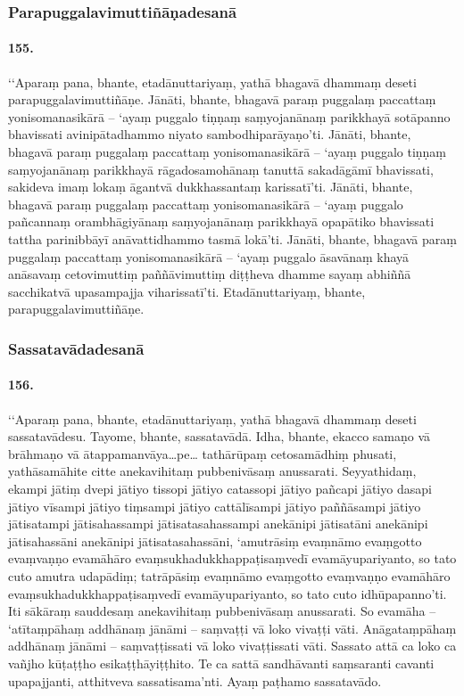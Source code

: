\subsubsection{Parapuggalavimuttiñāṇadesanā}

\paragraph{155.} ‘‘Aparaṃ pana, bhante, etadānuttariyaṃ, yathā bhagavā dhammaṃ deseti parapuggalavimuttiñāṇe. Jānāti, bhante, bhagavā paraṃ puggalaṃ paccattaṃ yonisomanasikārā – ‘ayaṃ puggalo tiṇṇaṃ saṃyojanānaṃ parikkhayā sotāpanno bhavissati avinipātadhammo niyato sambodhiparāyaṇo’ti. Jānāti, bhante, bhagavā paraṃ puggalaṃ paccattaṃ yonisomanasikārā – ‘ayaṃ puggalo tiṇṇaṃ saṃyojanānaṃ parikkhayā rāgadosamohānaṃ tanuttā sakadāgāmī bhavissati, sakideva imaṃ lokaṃ āgantvā dukkhassantaṃ karissatī’ti. Jānāti, bhante, bhagavā paraṃ puggalaṃ paccattaṃ yonisomanasikārā – ‘ayaṃ puggalo pañcannaṃ orambhāgiyānaṃ saṃyojanānaṃ parikkhayā opapātiko bhavissati tattha parinibbāyī anāvattidhammo tasmā lokā’ti. Jānāti, bhante, bhagavā paraṃ puggalaṃ paccattaṃ yonisomanasikārā – ‘ayaṃ puggalo āsavānaṃ khayā anāsavaṃ cetovimuttiṃ paññāvimuttiṃ diṭṭheva dhamme sayaṃ abhiññā sacchikatvā upasampajja viharissatī’ti. Etadānuttariyaṃ, bhante, parapuggalavimuttiñāṇe.

\subsubsection{Sassatavādadesanā}

\paragraph{156.} ‘‘Aparaṃ pana, bhante, etadānuttariyaṃ, yathā bhagavā dhammaṃ deseti sassatavādesu. Tayome, bhante, sassatavādā. Idha, bhante, ekacco samaṇo vā brāhmaṇo vā ātappamanvāya…pe… tathārūpaṃ cetosamādhiṃ phusati, yathāsamāhite citte anekavihitaṃ pubbenivāsaṃ anussarati. Seyyathidaṃ, ekampi jātiṃ dvepi jātiyo tissopi jātiyo catassopi jātiyo pañcapi jātiyo dasapi jātiyo vīsampi jātiyo tiṃsampi jātiyo cattālīsampi jātiyo paññāsampi jātiyo jātisatampi jātisahassampi jātisatasahassampi anekānipi jātisatāni anekānipi jātisahassāni anekānipi jātisatasahassāni, ‘amutrāsiṃ evaṃnāmo evaṃgotto evaṃvaṇṇo evamāhāro evaṃsukhadukkhappaṭisaṃvedī evamāyupariyanto, so tato cuto amutra udapādiṃ; tatrāpāsiṃ evaṃnāmo evaṃgotto evaṃvaṇṇo evamāhāro evaṃsukhadukkhappaṭisaṃvedī evamāyupariyanto, so tato cuto idhūpapanno’ti. Iti sākāraṃ sauddesaṃ anekavihitaṃ pubbenivāsaṃ anussarati. So evamāha – ‘atītaṃpāhaṃ addhānaṃ jānāmi – saṃvaṭṭi vā loko vivaṭṭi vāti. Anāgataṃpāhaṃ addhānaṃ jānāmi – saṃvaṭṭissati vā loko vivaṭṭissati vāti. Sassato attā ca loko ca vañjho kūṭaṭṭho esikaṭṭhāyiṭṭhito. Te ca sattā sandhāvanti saṃsaranti cavanti upapajjanti, atthitveva sassatisama’nti. Ayaṃ paṭhamo sassatavādo.

